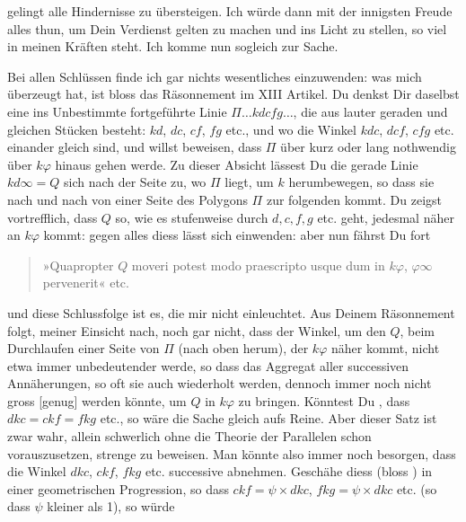 gelingt alle Hindernisse zu übersteigen. Ich würde dann mit der
innigsten Freude alles thun, um Dein Verdienst gelten zu machen und
ins Licht zu stellen, so viel in meinen Kräften steht. Ich komme nun
sogleich zur Sache.

Bei allen  Schlüssen finde ich gar nichts wesentliches
einzuwenden: was mich  
überzeugt hat, ist bloss das Räsonnement im XIII Artikel. Du denkst
Dir daselbst eine ins Unbestimmte fortgeführte Linie $\Pi\dots kdcfg\dots$,
die aus lauter geraden und gleichen Stücken besteht: $kd$, $dc$, $cf$,
$fg$ etc., und wo die Winkel $kdc$, $dcf$, $cfg$ etc. einander gleich
sind, und willst beweisen, dass $\Pi$ über kurz oder lang nothwendig
über $k\varphi$ hinaus gehen werde. Zu dieser Absicht lässest Du die
gerade Linie $kd\infty = Q$ sich nach der Seite zu, wo $\Pi$ liegt,
um $k$ herumbewegen, so dass sie nach und nach von einer Seite des
Polygons $\Pi$ zur folgenden kommt. Du zeigst vortrefflich, dass $Q$
so, wie es stufenweise durch $d, c, f, g$ etc. geht, jedesmal näher
an $k\varphi$ kommt: gegen alles diess lässt sich
einwenden: aber nun fährst Du fort
\begin{center}\end{center}
\begin{quote}
»Quapropter $Q$ moveri potest modo praescripto usque dum in
$k\varphi$, $\varphi\infty$ pervenerit« etc.
\end{quote}
und diese Schlussfolge ist es, die mir nicht einleuchtet. Aus Deinem
Räsonnement folgt, meiner Einsicht nach, noch gar nicht, dass der
Winkel, um den $Q$, beim Durchlaufen einer Seite von $\Pi$ (nach oben
herum), der $k\varphi$ näher kommt, nicht etwa immer unbedeutender
werde, so dass das Aggregat aller successiven Annäherungen, so oft
sie auch wiederholt werden, dennoch immer noch nicht gross [genug]
werden könnte, um $Q$ in $k\varphi$ zu bringen. Könntest Du ,
dass $dkc = ckf = fkg$ etc., so wäre die Sache gleich aufs Reine.
Aber dieser Satz ist zwar wahr, allein schwerlich ohne die Theorie
der Parallelen schon vorauszusetzen, strenge zu beweisen. Man könnte
also immer noch besorgen, dass die Winkel $dkc$, $ckf$, $fkg$ etc.
successive abnehmen. Geschähe diess (bloss ) in einer
geometrischen Progression, so dass $ckf = \psi \times dkc$,
$fkg = \psi \times dkc$ etc. (so dass $\psi$ kleiner als 1), so würde
